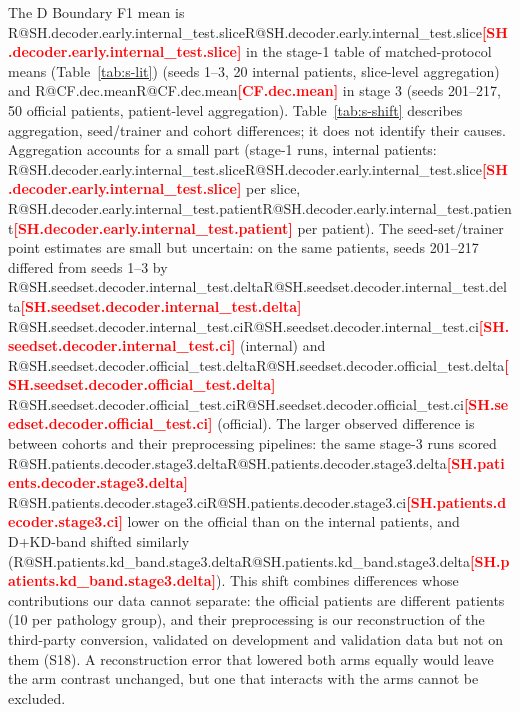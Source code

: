 \documentclass[10pt]{article}
\makeatletter
\newcommand{\R}[1]{\ifcsname R@#1\endcsname\csname R@#1\endcsname\else\textbf{\textcolor{red}{[#1]}}\fi}
\renewcommand\paragraph{\@startsection{paragraph}{4}{\z@}{1.6ex \@plus .5ex \@minus .2ex}{-1em}{\normalfont\normalsize\bfseries}}
\makeatother
\begin{document}
\begin{table}[!htbp]\centering\small

\caption{\label{tab:s-errloc}Share of D's wrong pixels within 2\,px of the reference contour, mean Boundary F1 gain over D, and Spearman $\rho$ between gain and near-boundary share across the 50 patients (post hoc).}
\end{table}

\paragraph{The D mean in stages 1 and 3.} The D Boundary F1 mean is \R{SH.decoder.early.internal_test.slice} in the stage-1 table of matched-protocol means (Table~\ref{tab:s-lit}) (seeds 1--3, 20 internal patients, slice-level aggregation) and \R{CF.dec.mean} in stage 3 (seeds 201--217, 50 official patients, patient-level aggregation). Table~\ref{tab:s-shift} describes aggregation, seed/trainer and cohort differences; it does not identify their causes. Aggregation accounts for a small part (stage-1 runs, internal patients: \R{SH.decoder.early.internal_test.slice} per slice, \R{SH.decoder.early.internal_test.patient} per patient). The seed-set/trainer point estimates are small but uncertain: on the same patients, seeds 201--217 differed from seeds 1--3 by \R{SH.seedset.decoder.internal_test.delta} \R{SH.seedset.decoder.internal_test.ci} (internal) and \R{SH.seedset.decoder.official_test.delta} \R{SH.seedset.decoder.official_test.ci} (official). The larger observed difference is between cohorts and their preprocessing pipelines: the same stage-3 runs scored \R{SH.patients.decoder.stage3.delta} \R{SH.patients.decoder.stage3.ci} lower on the official than on the internal patients, and D+KD-band shifted similarly (\R{SH.patients.kd_band.stage3.delta}). This shift combines differences whose contributions our data cannot separate: the official patients are different patients (10 per pathology group), and their preprocessing is our reconstruction of the third-party conversion, validated on development and validation data but not on them (S18). A reconstruction error that lowered both arms equally would leave the arm contrast unchanged, but one that interacts with the arms cannot be excluded.

\begin{table}[!htbp]\centering\small

\caption{\label{tab:s-shift}Boundary F1 of D and D+KD-band by seed set and test patients (post hoc). Slice-level: class macro per slice, averaged over slices (as in Table~\ref{tab:s-lit}); patient-level: averaged per patient first (the stage-3 estimator). Means of run means (SD between runs).}
\end{table}
\end{document}

